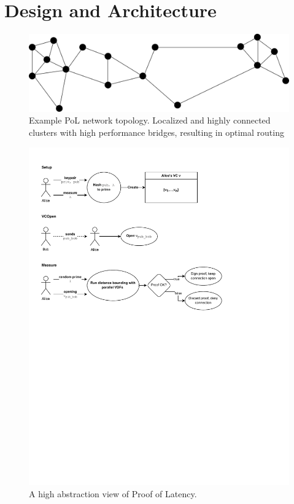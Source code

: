 \chapter{Design and Architecture}
\label{Proof of Latency}
\begin{figure}
	\includegraphics[width=\textwidth]{pictures/pol_topology.pdf}
	\caption{Example PoL network topology. Localized and highly connected clusters with high performance bridges, resulting in optimal routing}
	\label{PoL Example Topology}
\end{figure}

\begin{figure}
	\includegraphics[width=\textwidth]{pictures/PoL_highest_abstraction.pdf}
	\caption{A high abstraction view of Proof of Latency.}
	\label{PoL Diagram 1}
\end{figure}

